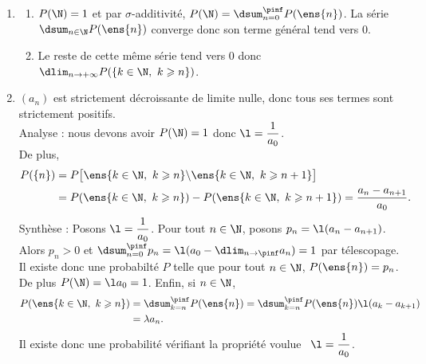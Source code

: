 \begin{enumerate}
\item
\begin{enumerate}
\item $P(\N)=1$ et par $\sigma$-additivité, $P(\N)=\dsum_{n=0}^{\pinf} P(\ens{n})$. La série $\dsum_{n\in\N} P(\ens{n})$ converge donc son terme général tend vers 0.
\item Le reste de cette même série tend vers 0 donc $\dlim _{n \rightarrow+\infty} P(\{k\in\N,\ k \geqslant n\})$.
\end{enumerate}
\item $(a_n)$ est strictement décroissante de limite nulle, donc tous ses termes sont strictement positifs. \\
Analyse : nous devons avoir $P(\N)=1$ donc $\l=\dfrac1{a_0}$.\\
De plus,
\begin{align*}
P(\{n\}) & =P\big[\ens{k\in\N,\ k \geqslant n} \backslash\ens{k\in\N,\ k \geqslant n+1}\big] \\
& =P(\ens{k\in\N,\ k \geqslant n})-P(\ens{k\in\N,\ k \geqslant n+1})=\frac{a_n-a_{n+1}}{a_0}.
\end{align*}
Synthèse : Posons $\l=\dfrac1{a_0}$. Pour tout $n\in\N$, posons $p_n=\l(a_{n}-a_{n+1})$. Alors $p_n>0$ et $\dsum_{n=0}^{\pinf}p_n=\l(a_0-\dlim_{n\to\pinf} a_n)=1$ par télescopage. Il existe donc une probabilté $P$ telle que pour tout $n\in\N$, $P(\ens{n})=p_n$. De plus $P(\N)=\l a_0=1$. Enfin, si $n\in\N$,
\begin{align*}
P(\ens{k\in\N,\ k \geqslant n})&=\dsum_{k=n}^{\pinf}P(\ens{n})= \dsum_{k=n}^{\pinf}P(\ens{n})\l(a_{k}-a_{k+1})\\
&= \lambda a_n.
\end{align*}
Il existe donc une probabilité vérifiant la propriété voulue \ssi\ $\l=\dfrac1{a_0}$.
\end{enumerate}
